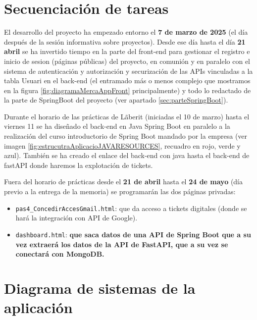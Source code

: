 \documentclass[a4paper,12pt]{report}
\begin{document}
		
		\section{Secuenciación de tareas}
		
		El desarrollo del proyecto ha empezado entorno el \textbf{7 de marzo de 2025} (el día después de la sesión informativa sobre proyectos). Desde ese día hasta el día \textbf{21 abril} se ha invertido tiempo en la parte del front-end para gestionar el registro e inicio de sesion (páginas públicas) del proyecto, en comunión y en paralelo con el sistema de autenticación y autorización y securización de las APIs vinculadas a la tabla Usuari en el back-end (el entramado más o menos complejo que mostramos en la figura \ref{fig:diagramaMercaAppFront} principalmente) y todo lo redactado de la parte de SpringBoot del proyecto (ver apartado \ref{sec:parteSpringBoot}).
		
		Durante el horario de las prácticas de Lãberit (iniciadas el 10 de marzo) hasta el viernes 11 se ha diseñado el back-end en Java Spring Boot en paralelo a la realización del curso introductorio de Spring Boot mandado por la empresa (ver imagen \ref{fig:estrucutraAplicacioJAVARESOURCES}, recuadro en rojo, verde y azul). También se ha creado el enlace del back-end con java hasta el back-end de fastAPI donde haremos la explotación de tickets.
		
		Fuera del horario de prácticas desde el \textbf{21 de abril} hasta el \textbf{24 de mayo} (día previo a la entrega de la memoria) se programarán las dos páginas privadas: 
		
		\begin{itemize}
			\item \texttt{pas4\_ConcedirAccesGmail.html}: que da acceso a tickets digitales (donde se hará la integración con API de Google).
			\item \texttt{dashboard.html}: \textbf{que saca datos de una API de Spring Boot que a su vez extraerá los datos de la API de FastAPI, que a su vez se conectará con MongoDB.}
		\end{itemize}

		
		
		
		

		

		
		\section{Diagrama de sistemas de la aplicación}
		
\end{document}
